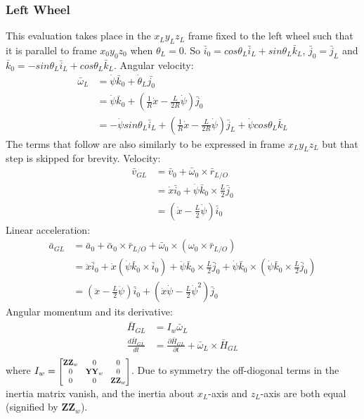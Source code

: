 \documentclass[a4paper,10pt]{article}
\newcommand\scalemath[2]{\scalebox{#1}{\mbox{\ensuremath{\displaystyle #2}}}}
\begin{document}
\subsubsection{Left Wheel}
This evaluation takes place in the $x_Ly_Lz_L$ frame fixed to the left wheel such that it is parallel to 
frame $x_0y_0z_0$ when $\theta_L = 0$. So $\bar{i}_0 = cos\theta_L\bar{i}_L+sin\theta_L\bar{k}_L$, 
$\bar{j}_0 = \bar{j}_L$ and $\bar{k}_0 = -sin\theta_L\bar{i}_L+cos\theta_L\bar{k}_L$.
Angular velocity:
\begin{align}
 \bar{\omega}_L &= \dot\psi\bar{k}_0 + \dot\theta_L\bar{j_0} \nonumber \\
 &= \dot\psi\bar{k}_0 + \left(\frac{1}{R}\dot{x}-\frac{L}{2R}\dot\psi\right)\bar{j}_0 \nonumber \\
 &= -\dot\psi sin\theta_L\bar{i}_L + \left(\frac{1}{R}\dot{x}-\frac{L}{2R}\dot\psi\right)\bar{j}_L + \dot\psi cos\theta_L\bar{k}_L \label{kanesLHSVariableStart}
\end{align}
The terms that follow are also similarly to be expressed in frame $x_Ly_Lz_L$ but that step is skipped for brevity.
Velocity:
\begin{align}
  \bar{v}_{GL} &= \bar{v}_0 + \bar{\omega}_0 \times \bar{r}_{L/O} \nonumber \\
 &= \dot{x}\bar{i}_0 + \dot\psi\bar{k}_0 \times \frac{L}{2}\bar{j}_0 \nonumber \\
 &= \left(\dot{x}-\frac{L}{2}\dot\psi\right)\bar{i}_0  
\end{align}
Linear acceleration:
\begin{align}
 \bar{a}_{GL} &= \bar{a}_0 + \bar\alpha_0 \times \bar{r}_{L/O} + \bar\omega_0 \times \left( \omega_0 \times \bar{r}_{L/O}\right) \nonumber \\
 &= \ddot{x}\bar{i}_0 + \dot{x}\left(\dot\psi\bar{k}_0 \times \bar{i}_0\right)+ \ddot\psi\bar{k}_0 \times \frac{L}{2}\bar{j}_0 + \dot\psi\bar{k}_0 \times \left( \dot\psi\bar{k}_0 \times \frac{L}{2}\bar{j}_0\right) \nonumber \\
 &= \left(\ddot{x}-\frac{L}{2}\ddot\psi\right)\bar{i}_0 + \left(\dot{x}\dot\psi- \frac{L}{2}\dot\psi^2\right)\bar{j}_0  
\end{align}
Angular momentum and its derivative:
\begin{align}
 \bar{H}_{GL} &= I_w\bar{\omega}_L \nonumber \\
 \frac{d\bar{H}_{GL}}{dt} &= \frac{\partial \bar{H}_{GL}}{\partial t} + \bar\omega_L \times \bar{H}_{GL} \nonumber \\
\end{align}
where $I_w = \scalemath{0.75}{\left[\begin{matrix} \mathbf{ZZ}_w & 0 & 0 \\  0 & \mathbf{YY}_w & 0 \\ 0 & 0 & \mathbf{ZZ}_w \end{matrix}\right]}$. Due to symmetry the off-diogonal terms in the inertia matrix vanish, and the 
inertia about $x_L$-axis and $z_L$-axis are both equal (signified by $\mathbf{ZZ}_w$).
\end{document}
